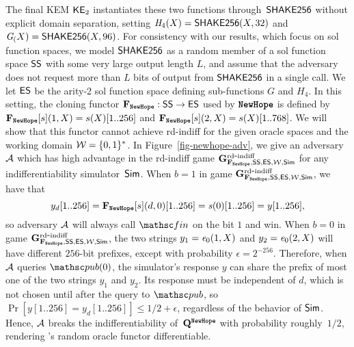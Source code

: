 The final KEM ${\mathsf{KE}}_2$ instantiates these two functions through~$\mathsf{SHAKE256}$ without explicit domain separation, setting $\mathit{H}_4(X) = \mathsf{SHAKE256}(X,32)$ and $\mathit{G}_(X) = \mathsf{SHAKE256}(X,96)$.
For consistency with our results, which focus on sol function spaces, we model $\mathsf{SHAKE256}$ as a random member of a sol function space $\mathsf{SS}$ with some very large output length $L$, and assume that the adversary does not request more than $L$ bits of output from  $\mathsf{SHAKE256}$ in a single call. We let $\mathsf{ES}$ be the arity-2 sol function space defining sub-functions $G$ and $H_4$.
In this setting, the cloning functor $\construct{F}_{\pqcnameRoundTwo{NewHope}}: \GenroSp{\functionInSet} \to \GenroSp{\functionOutSet}$ used by $\pqcnameRoundTwo{NewHope}$ is defined by $\construct{F}_{\pqcnameRoundTwo{NewHope}}[\functionIn](1,X)= s(X)[1..256]$ and $\construct{F}_{\pqcnameRoundTwo{NewHope}}[\functionIn](2,X) = s(X)[1..768]$.
We will show that this functor cannot achieve rd-indiff for the given oracle spaces and the working domain ${\cal W}=\{0,1\}^*$. In Figure~\ref{fig-newhope-adv}, we give an adversary~$\mathcal{A}$ which has high advantage in the rd-indiff game $\ngameCCINDIFF{\construct{F}_{\pqcnameRoundTwo{NewHope}},\GenroSp{\functionInSet},\GenroSp{\functionOutSet},\workDom,\simulator}$ for any indifferentiability simulator~$\mathsf{Sim}$. When $b=1$ in game $\ngameCCINDIFF{\construct{F}_{\pqcnameRoundTwo{NewHope}},\GenroSp{\functionInSet},\GenroSp{\functionOutSet},\workDom,\simulator}$, we have that
\[ y_d[1..256] = \construct{F}_{\pqcnameRoundTwo{NewHope}}[s](d,0)[1..256] =  \aFunc{\functionIn}(0)[1..256] = y[1..256],\]
so adversary $\mathcal{A}$ will always call $\Fin$ on the bit $1$ and win.
When $b=0$ in game $\ngameCCINDIFF{\construct{F}_{\pqcnameRoundTwo{NewHope}},\GenroSp{\functionInSet},\GenroSp{\functionOutSet},\workDom,\simulator}$, the two strings $y_1 =\mathit{e}_0(1,X)$ and $y_2 = \mathit{e}_0(2,X)$ will have different $256$-bit prefixes, except with probability $\epsilon = 2^{-256}$. 
Therefore, when $\mathcal{A}$ queries $\pub(0)$, the simulator's response $y$ can share the prefix of most one of the two strings $y_1$ and $y_2$. 
Its response must be independent of $d$, which is not chosen until after the query to $\pub$, so $\Pr[y[1..256] = y_d[1..256]] \leq 1/2+\epsilon$, regardless of the behavior of $\mathsf{Sim}$.
Hence, $\mathcal{A}$ breaks the indifferentiability of~$\queryRO^{\pqcnameRoundTwo{NewHope}}$ with probability roughly~$1/2$, rendering 's random oracle functor differentiable.

